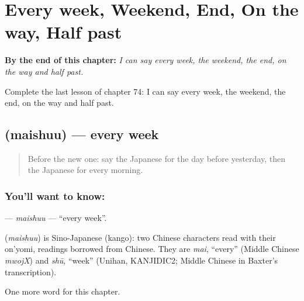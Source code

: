 
\chapter{Every week, Weekend, End, On the way, Half past}
\label{ch:ja-every-week-weekend-end-on-the-way-half-past}

\begin{chapteropening}
\textbf{By the end of this chapter:} \emph{I can say every week, the weekend, the end, on the way and half past.}

Complete the last lesson of chapter 74: I can say every week, the weekend, the end, on the way and half past.
\end{chapteropening}

\section[\texorpdfstring{\ja{まいしゅう} (maishuu)}{まいしゅう (maishuu)}]{ (maishuu) — every week}

\label{lesson:JA-C74-maishuu}



\begin{quote}
Before the new one: say the Japanese for the day before yesterday, then the Japanese for every morning.
\end{quote}

\subsection*{You'll want to know: }
\textbf{} — \emph{maishuu} — \textquotedblleft{}every week\textquotedblright{}.

\begin{cousinweb}
\textbf{} (\emph{maishuu}) is Sino-Japanese (kango): two Chinese characters read with their on'yomi, readings borrowed from Chinese. They are \emph{mai}, \textquotedblleft{}every\textquotedblright{} (Middle Chinese \emph{mwojX}) and \emph{shū}, \textquotedblleft{}week\textquotedblright{} (Unihan, KANJIDIC2; Middle Chinese in Baxter's transcription).
\end{cousinweb}

\begin{grammarlens}[title={What you've built}]
One more word for this chapter.
\end{grammarlens}

